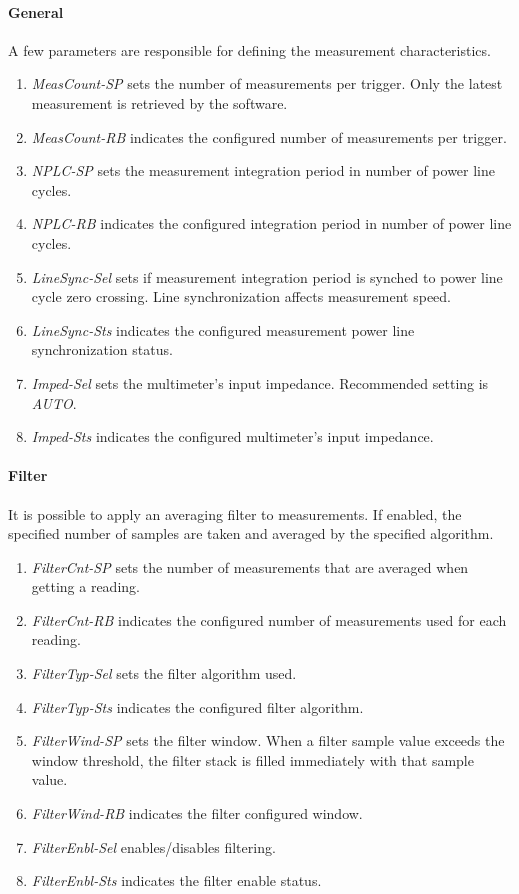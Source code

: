 \documentclass[openany]{article}
\begin{document}
		\paragraph{General} A few parameters are responsible for defining the measurement characteristics.

			\begin{enumerate}
			\item \emph{MeasCount-SP} sets the number of measurements per trigger. Only the latest measurement is retrieved by the software.
			\item \emph{MeasCount-RB} indicates the configured number of measurements per trigger.
			\item \emph{NPLC-SP} sets the measurement integration period in number of power line cycles.
			\item \emph{NPLC-RB} indicates the configured integration period in number of power line cycles.
			\item \emph{LineSync-Sel} sets if measurement integration period is synched to power line cycle zero crossing. Line synchronization affects measurement speed.
			\item \emph{LineSync-Sts} indicates the configured measurement power line synchronization status.
			\item \emph{Imped-Sel} sets the multimeter's input impedance. Recommended setting is \emph{AUTO}.
			\item \emph{Imped-Sts} indicates the configured multimeter's input impedance.
			\end{enumerate}

		\paragraph{Filter} It is possible to apply an averaging filter to measurements. If enabled, the specified number of samples are taken and averaged by the specified algorithm.

			\begin{enumerate}
			\item \emph{FilterCnt-SP} sets the number of measurements that are averaged when getting a reading.
			\item \emph{FilterCnt-RB} indicates the configured number of measurements used for each reading.
			\item \emph{FilterTyp-Sel} sets the filter algorithm used.
			\item \emph{FilterTyp-Sts} indicates the configured filter algorithm.
			\item \emph{FilterWind-SP} sets the filter window. When a filter sample value exceeds the window threshold, the filter stack is filled immediately with that sample value.
			\item \emph{FilterWind-RB} indicates the filter configured window.
			\item \emph{FilterEnbl-Sel} enables/disables filtering.
			\item \emph{FilterEnbl-Sts} indicates the filter enable status.
			\end{enumerate}
\end{document}
